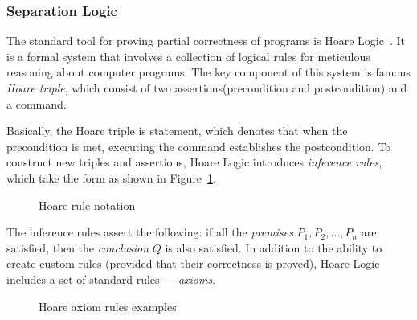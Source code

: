 \documentclass[14pt]{constructor-diploma}
\begin{document}
\subsubsection{Separation Logic}
The standard tool for proving partial correctness of programs is Hoare Logic~\cite{Hoare}.
It is a formal system that involves a collection of logical rules for meticulous reasoning about computer programs.
The key component of this system is famous \textit{Hoare triple}, which consist of two assertions(precondition and postcondition) and a command.
\begin{figure}[H]
  \vspace*{-15pt}
  \begin{center}
    
  \end{center}
  \vspace*{-70pt}
\end{figure}
Basically, the Hoare triple is statement, which denotes that
when the precondition is met, executing the command establishes the postcondition. 
To construct new triples and assertions, Hoare Logic introduces \textit{inference rules}, which take the form as shown in Figure~\ref{fig:hoare_rule}.
\begin{figure}[H]
  \vspace*{-15pt}
  \begin{center}
    
  \end{center}
  \vspace*{-60pt}
  \caption{Hoare rule notation}
  \label{fig:hoare_rule}
\end{figure}
The inference rules assert the following: if all the \textit{premises} $P_1, P_2, \dotsc, P_n$ are satisfied, then the \textit{conclusion} $Q$ is also satisfied.
In addition to the ability to create custom rules (provided that their correctness is proved), Hoare Logic includes a set of standard rules --- \textit{axioms}.
\begin{figure}[H]
  \vspace*{-15pt}
  \begin{center}
    
  \end{center}
  \vspace*{-50pt}
  \caption[fontsize=\small]{Hoare axiom rules examples}
\end{figure}
\end{document}
